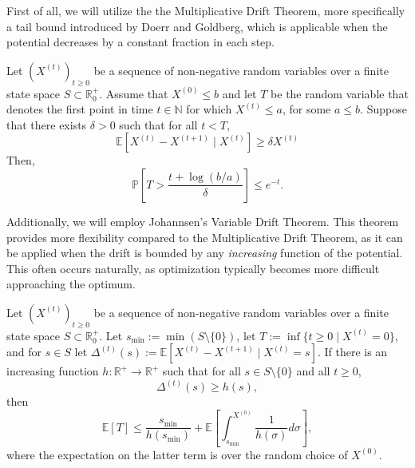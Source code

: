 First of all, we will utilize the the Multiplicative Drift Theorem, more specifically a tail bound introduced by Doerr and Goldberg, which is applicable when the potential decreases by a constant fraction in each step.
\vspace{3mm}
\begin{theorem} \label{the:MDT,Tail}
Let $(X^{(t)})_{t\ge0}$ be a sequence of non-negative random variables over a finite state space $S \subset \mathbb{R}_0^+$. Assume that $X^{(0)} \le b$ and let $T$ be the random variable that denotes the first point in time $t \in \mathbb{N}$ for which $X^{(t)} \le a$, for some $a \le b$. Suppose that there exists $\delta > 0$ such that for all $t < T$, 
\begin{displaymath}
    \mathbb{E}[X^{(t)}-X^{(t+1)} \; | \; X^{(t)}] \ge \delta X^{(t)}
\end{displaymath}
Then,
\begin{displaymath}
    \mathbb{P}[T > \frac{t+\log(b/a)}{\delta}]\le e^{-t}.
\end{displaymath}
\end{theorem}
\vspace{3mm}
Additionally, we will employ Johannsen's Variable Drift Theorem. This theorem provides more flexibility compared to the Multiplicative Drift Theorem, as it can be applied when the drift is bounded by any \emph{increasing} function of the potential. This often occurs naturally, as optimization typically becomes more difficult approaching the optimum.
\vspace{3mm}
\begin{theorem} \label{the:VDT}
Let $(X^{(t)})_{t\ge0}$ be a sequence of non-negative random variables over a finite state space $S \subset \mathbb{R}_0^+$. Let $s_{\text{min}} := \min(S \setminus \{0\})$, let $T := \inf\{t\ge0 \; |\; X^{(t)} = 0\}$, and for $s \in S$ let $\Delta^{(t)}(s) := \mathbb{E}[X^{(t)} - X^{(t+1)} \; |\; X^{(t)} =s]$. If there is an increasing function $h: \mathbb{R}^+ \rightarrow \mathbb{R}^+$ such that for all $s \in S \setminus \{0\}$ and all $t \ge 0$,
\begin{displaymath}
    \Delta^{(t)}(s) \ge h(s),
\end{displaymath}
then
\begin{displaymath}
    \mathbb{E}[T] \le \frac{s_{\text{min}}}{h(s_\text{min})} + \mathbb{E} \left[ \int_{s_\text{min}}^{X^{(0)}} \frac{1}{h(\sigma)}d\sigma \right],
\end{displaymath}
where the expectation on the latter term is over the random choice of $X^{(0)}$.
\end{theorem}
\vspace{3mm}

